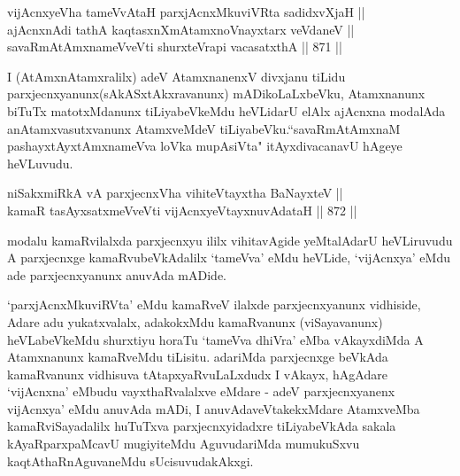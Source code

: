 
\begin{shl}
vijAcnxyeVha tameVvAtaH parxjAcnxMkuviVRta sadidxvXjaH || \\
ajAcnxnAdi tathA kaqtasxnXmAtamxnoV\s nayxtarx veVdaneV || \\
savaRmAtAmxnameVveVti shurxteVrapi vacasatxthA \hfill || 871 ||  
\end{shl}

\begin{artha}
I (AtAmxnAtamxralilx) adeV AtamxnanenxV divxjanu tiLidu parxjecnxyanunx\break (sAkASxtAkxravanunx) mADikoLaLxbeVku, Atamxnanunx biTuTx matotxMdanunx tiLiyabeVkeMdu heVLidarU elAlx ajAcnxna modalAda anAtamxvasutxvanunx AtamxveMdeV tiLiyabeVku.``savaRmAtAmxnaM pashayxtAyxtAmxnameVva loVka mupAsiVta" itAyxdivacanavU hAgeye heVLuvudu.
\end{artha}


\begin{shl}
niSakxmiRkA vA parxjecnxVha vihiteVtayxtha BaNayxteV || \\
kamaR tasAyxsatxmeVveVti vijAcnxyeVtayxnuvAdataH \hfill || 872 ||  
\end{shl}

\begin{artha}
modalu kamaRvilalxda parxjecnxyu ililx vihitavAgide yeMtalAdarU heVLiruvudu A parxjecnxge kamaRvubeVkAdalilx `tameVva' eMdu heVLide, `vijAcnxya' eMdu ade parxjecnxyanunx anuvAda mADide.
\end{artha}


\begin{artha}
`parxjAcnxMkuviRVta' eMdu kamaRveV ilalxde parxjecnxyanunx vidhiside, Adare adu yukatxvalalx, adakokxMdu kamaRvanunx (viSayavanunx) heVLabeVkeMdu shurxtiyu horaTu `tameVva dhiVra' eMba vAkayxdiMda A Atamxnanunx kamaRveMdu tiLisitu. adariMda parxjecnxge beVkAda kamaRvanunx vidhisuva tAtapxyaRvuLaLxdudx I vAkayx, hAgAdare `vijAcnxna' eMbudu vayxthaRvalalxve eMdare - adeV parxjecnxyanenx vijAcnxya' eMdu anuvAda mADi, I anuvAdaveVtakekxMdare AtamxveMba kamaRviSayadalilx huTuTxva parxjecnxyidadxre tiLiyabeVkAda sakala kAyaRparxpaMcavU mugiyiteMdu AguvudariMda mumukuSxvu kaqtAthaRnAguvaneMdu sUcisuvudakAkxgi.
\end{artha}



